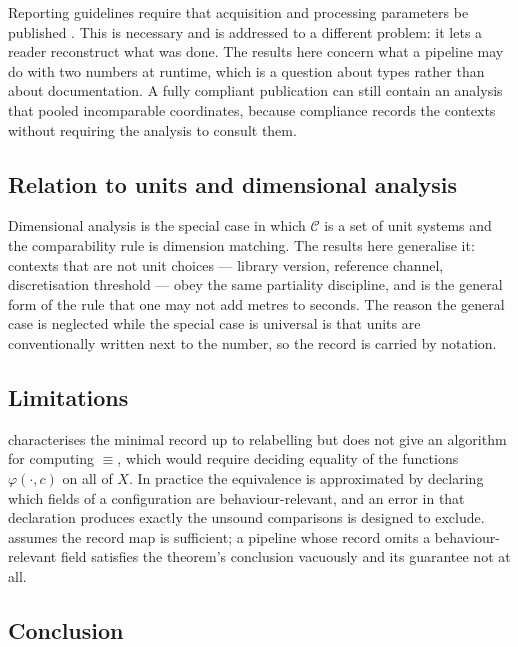 \documentclass[11pt,a4paper]{article}
\theoremstyle{definition}
\theoremstyle{remark}
\newcommand{\Ctx}{\mathcal{C}}               %
\begin{document}
Reporting guidelines require that acquisition and processing parameters
be published \citep{taylor2007guidelines}. This is necessary and is
addressed to a different problem: it lets a reader reconstruct what was
done. The results here concern what a pipeline may do with two numbers at
runtime, which is a question about types rather than about documentation.
A fully compliant publication can still contain an analysis that pooled
incomparable coordinates, because compliance records the contexts without
requiring the analysis to consult them.

\subsection{Relation to units and dimensional analysis}

Dimensional analysis is the special case in which $\Ctx$ is a set of unit
systems and the comparability rule is dimension matching. The results
here generalise it: contexts that are not unit choices --- library
version, reference channel, discretisation threshold --- obey the same
partiality discipline, and  is the general form
of the rule that one may not add metres to seconds. The reason the
general case is neglected while the special case is universal is that
units are conventionally written next to the number, so the record is
carried by notation.

\subsection{Limitations}

 characterises the minimal record up to
relabelling but does not give an algorithm for computing $\equiv$, which
would require deciding equality of the functions $\varphi(\cdot,c)$ on
all of $X$. In practice the equivalence is approximated by declaring
which fields of a configuration are behaviour-relevant, and an error in
that declaration produces exactly the unsound comparisons
 is designed to exclude. 
assumes the record map is sufficient; a pipeline whose record omits a
behaviour-relevant field satisfies the theorem's conclusion vacuously and
its guarantee not at all.

\subsection{Conclusion}
\end{document}
